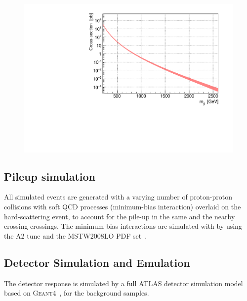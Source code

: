 \begin{figure}[h]
  \begin{center}
    \includegraphics[width=120mm]{figures/Samples/xsec_GG/xsec_GG.pdf}
    \label{fig::Samples::xsec_GG}
  \end{center}
\end{figure}



\subsection{Pileup simulation}
All simulated events are generated with a varying number of proton-proton collisions with soft QCD processes (minimum-bias interaction) overlaid on the hard-scattering event,
 to account for the pile-up in the same and the nearby crossing crossings.
The minimum-bias interactions are simulated with by  using the A2 tune \cite{ATLAS:2012uec} and the MSTW2008LO PDF set~\cite{MSTW}. 


\subsection{Detector Simulation and Emulation}
The detector response is simulated by a full ATLAS detector simulation model \cite{ATLASFullSimu:2010wqa} based on \textsc{Geant4}~\cite{Agostinelli:2002hh}, for the background samples. \\

